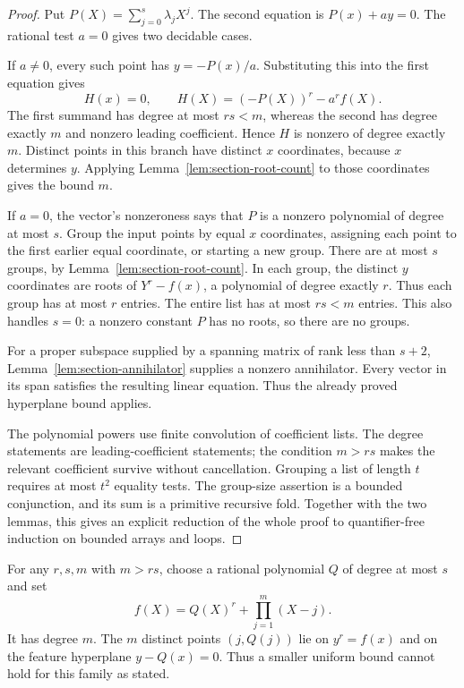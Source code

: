 \begin{proof}
Put $P(X)=\sum_{j=0}^s\lambda_jX^j$. The second equation is
$P(x)+ay=0$. The rational test $a=0$ gives two decidable cases.

If $a\ne0$, every such point has $y=-P(x)/a$. Substituting this
into the first equation gives
\[
             H(x)=0,\qquad H(X)=(-P(X))^r-a^rf(X).
\]
The first summand has degree at most $rs<m$, whereas the second has
degree exactly $m$ and nonzero leading coefficient. Hence $H$ is
nonzero of degree exactly $m$. Distinct points in this branch have
distinct $x$ coordinates, because $x$ determines $y$. Applying
Lemma~\ref{lem:section-root-count} to those coordinates gives the
bound $m$.

If $a=0$, the vector's nonzeroness says that $P$ is a nonzero
polynomial of degree at most $s$. Group the input points by equal
$x$ coordinates, assigning each point to the first earlier equal
coordinate, or starting a new group. There are at most $s$ groups,
by Lemma~\ref{lem:section-root-count}. In each group, the distinct
$y$ coordinates are roots of $Y^r-f(x)$, a polynomial of degree
exactly $r$. Thus each group has at most $r$ entries. The entire
list has at most $rs<m$ entries. This also handles $s=0$: a
nonzero constant $P$ has no roots, so there are no groups.

For a proper subspace supplied by a spanning matrix of rank less
than $s+2$, Lemma~\ref{lem:section-annihilator} supplies a nonzero
annihilator. Every vector in its span satisfies the resulting
linear equation. Thus the already proved hyperplane bound applies.

The polynomial powers use finite convolution of coefficient lists.
The degree statements are leading-coefficient statements; the
condition $m>rs$ makes the relevant coefficient survive without
cancellation. Grouping a list of length $t$ requires at most $t^2$
equality tests. The group-size assertion is a bounded conjunction,
and its sum is a primitive recursive fold. Together with the two
lemmas, this gives an explicit reduction of the whole proof to
quantifier-free induction on bounded arrays and loops.
\end{proof}

\begin{remark}
For any $r,s,m$ with $m>rs$, choose a rational polynomial $Q$ of
degree at most $s$ and set
\[
          f(X)=Q(X)^r+\prod_{j=1}^{m}(X-j).
\]
It has degree $m$. The $m$ distinct points $(j,Q(j))$ lie on
$y^r=f(x)$ and on the feature hyperplane $y-Q(x)=0$. Thus a
smaller uniform bound cannot hold for this family as stated.
\end{remark}

